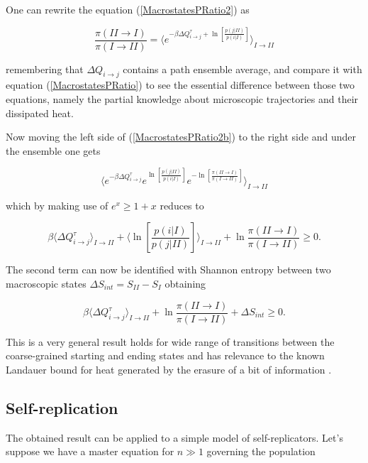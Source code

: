 \documentclass[a4paper,12pt]{article}
\begin{document}
One can rewrite the equation (\ref{MacrostatesPRatio2}) as 

\begin{equation}
\label{MacrostatesPRatio2b}
  \frac{\pi(II \to I)}{\pi(I \to II)} 
  =\langle e^{- \beta \Delta Q_{i\to j}^{\tau} + \ln[\frac{p(j|II)}{p(i|I)}]} \rangle_{I \to II}
\end{equation}

remembering that $\Delta Q_{i \to j}$ contains a path ensemble average,
and compare it with equation (\ref{MacrostatesPRatio}) to see the essential difference between those two equations, namely the partial knowledge about microscopic trajectories and their dissipated heat.

Now moving the left side of (\ref{MacrostatesPRatio2b}) to the right side and under the ensemble one gets

\begin{equation}
\langle  e^{- \beta \Delta Q_{i\to j}^{\tau}} e^{\ln[\frac{p(j|II)}{p(i|I)}]} e^{-\ln[\frac{\pi(II \to I)}{\pi(I \to II)}]} \rangle_{I \to II}
\end{equation}

which by making use of $e^x \geq 1+x$ reduces to

\begin{equation}
  \beta \langle\Delta Q_{i\to j}^{\tau} \rangle_{I \to II}+\langle \ln[\frac{p(i|I)}{p(j|II)}]  \rangle_{I \to II}+ \ln{\frac{\pi(II \to I)}{\pi(I \to II)}} \geq 0.
\end{equation}

The second term can now be identified with Shannon entropy between two macroscopic states $\Delta S_{int} = S_{II}- S_{I}$ obtaining


\begin{equation}
\label{SecondLawII}
  \beta \langle\Delta Q_{i\to j}^{\tau} \rangle_{I \to II} + \ln{\frac{\pi(II \to I)}{\pi(I \to II)}} +\Delta S_{int}  \geq 0.
\end{equation}

This is a very general result holds for wide range of transitions between the coarse-grained starting and ending states and has relevance to the known Landauer bound for heat generated by the erasure of a bit of information \cite{England:2013ed}.

\subsection{Self-replication}
The obtained result can be applied to a simple model of self-replicators. Let's suppose we have a master equation for $n \gg 1$ governing the population
\end{document}
